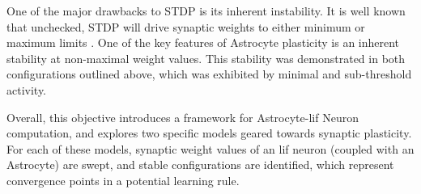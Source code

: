 One of the major drawbacks to STDP is its inherent instability. It is well known
that unchecked, STDP will drive synaptic weights to either minimum or maximum
limits \parencite{legenstein_2005}. One of the key features of Astrocyte plasticity
is an inherent stability at non-maximal weight values. This stability was
demonstrated in both configurations outlined above, which was exhibited by
minimal and sub-threshold \ca activity.

Overall, this objective introduces a framework for Astrocyte-\Gls{lif} Neuron
computation, and explores two specific models geared towards synaptic
plasticity. For each of these models, synaptic weight values of an \Gls{lif} neuron
(coupled with an Astrocyte) are swept, and stable configurations are identified,
which represent convergence points in a potential learning rule.




